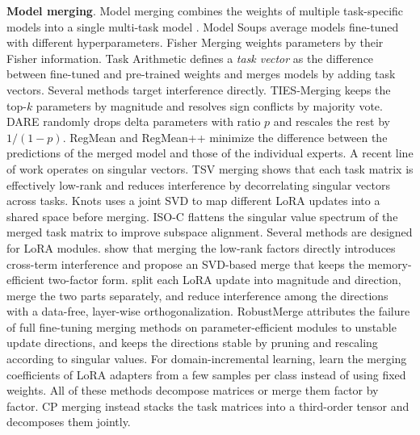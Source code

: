 \documentclass[10pt]{article} %
\begin{document}
    \noindent
    \textbf{Model merging}. Model merging combines the weights of multiple
    task-specific models into a single multi-task model \citep{davari2024model,ilharco2022editing,matena2022merging,wortsman2022model,yadav2023ties,yu2024language,lu2024twin,yang2026model,deep2024della,miyano2025adaptive,chen2025black}. Model Soups \citep{wortsman2022model,choi2024revisiting} average models fine-tuned with different hyperparameters. Fisher Merging \citep{matena2022merging} weights parameters by their Fisher information. Task Arithmetic \citep{ilharco2022editing} defines a \textit{task vector} as the difference between fine-tuned and pre-trained weights and merges models by adding task vectors. Several methods target interference directly. TIES-Merging \citep{yadav2023ties} keeps the top-$k$ parameters by magnitude and resolves sign conflicts by majority vote. DARE \citep{yu2024language} randomly drops delta parameters with ratio $p$ and rescales the rest by $1/(1-p)$. RegMean and RegMean++ \citep{reg_mean,nguyen2025regmean++} minimize the difference between the predictions of the merged model and those of the individual experts. A recent line of work operates on singular vectors. TSV merging \citep{gargiulo2025task} shows that each task matrix is effectively low-rank and reduces interference by decorrelating singular vectors across tasks. Knots \citep{stoica2025model} uses a joint SVD to map different LoRA updates into a shared space before merging. ISO-C \citep{marczak2025no} flattens the singular value spectrum of the merged task matrix to improve subspace alignment. Several methods are designed for LoRA modules. \citet{tang2025lora} show that merging the low-rank factors directly introduces cross-term interference and propose an SVD-based merge that keeps the memory-efficient two-factor form. \citet{zheng2025decouple} split each LoRA update into magnitude and direction, merge the two parts separately, and reduce interference among the directions with a data-free, layer-wise orthogonalization. RobustMerge \citep{zeng2025robustmerge} attributes the failure of full fine-tuning merging methods on parameter-efficient modules to unstable update directions, and keeps the directions stable by pruning and rescaling according to singular values. For domain-incremental learning, \citet{coleman2024adaptive} learn the merging coefficients of LoRA adapters from a few samples per class instead of using fixed weights. All of these methods decompose matrices or merge them factor by factor. CP merging instead stacks the task matrices into a third-order tensor and decomposes them jointly.
\end{document}
